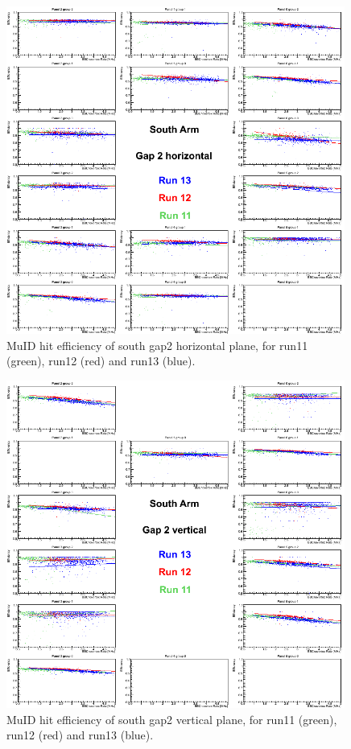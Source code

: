 \clearpage
\begin{center}
  \begin{figure}[p]
    \includegraphics[width=0.99\textwidth]{./figures/efficomp_South_gap2_horizontal.png}
    \caption{\label{Fig:efficiency:MuIdEff:a0g2p0}MuID hit efficiency of south gap2 horizontal plane, for run11 (green), run12 (red) and run13 (blue).}
  \end{figure}
\end{center}
\begin{center}
  \begin{figure}[p]
    \includegraphics[width=0.99\textwidth]{./figures/efficomp_South_gap2_vertical.png}
    \caption{\label{Fig:efficiency:MuIdEff:a0g2p1}MuID hit efficiency of south gap2 vertical plane, for run11 (green), run12 (red) and run13 (blue).}
  \end{figure}
\end{center}
